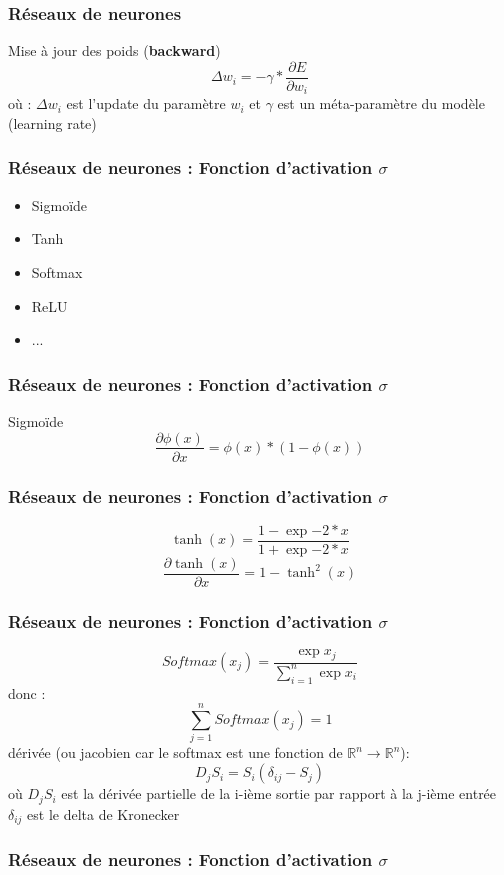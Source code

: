 \documentclass{formation}
\begin{document}
\begin{frame}
  \frametitle{Réseaux de neurones}
  Mise à jour des poids (\textbf{backward})
  \[
  \Delta w_i = -\gamma * \frac{\partial{E}}{\partial{w_i}}
  \]
  \newline
  où :
  \newline
  $\Delta w_i$ est l'update du paramètre $w_i$ et
  \newline
  $\gamma$ est un méta-paramètre du modèle (learning rate)
\end{frame}

\begin{frame}
  \frametitle{Réseaux de neurones : Fonction d'activation $\sigma$}
  \begin{itemize}
  \item Sigmoïde
  \item Tanh
  \item Softmax
  \item ReLU
  \item ...
  \end{itemize}
\end{frame}

\begin{frame}
  \frametitle{Réseaux de neurones : Fonction d'activation $\sigma$}
  Sigmoïde
  \[
  \frac{\partial{\phi(x)}}{\partial{x}}=\phi(x)*(1-\phi(x))
  \]
\end{frame}

\begin{frame}
  \frametitle{Réseaux de neurones : Fonction d'activation $\sigma$}
  \[
  \tanh(x)=\frac{1-\exp{-2*x}}{1+\exp{-2*x}}
  \]
  \[
  \frac{\partial{\tanh(x)}}{\partial{x}}=1-\tanh^2(x)
  \]
\end{frame}

\begin{frame}
  \frametitle{Réseaux de neurones : Fonction d'activation $\sigma$}
  \[
  \mathit{Softmax}(x_j)=\frac{\exp{x_j}}{\sum_{i=1}^n{\exp{x_i}}}
  \]
  donc :
  \[
  \sum_{j=1}^n{\mathit{Softmax}(x_j)}=1
  \]
  dérivée (ou jacobien car le softmax est une fonction de $\mathbb{R}^n\rightarrow\mathbb{R}^n$):
  \[
  D_jS_i = S_i(\delta_{ij}-S_j)
  \]
  où
  $D_jS_i$ est la dérivée partielle de la i-ième sortie par rapport à la j-ième entrée
  \newline
  $\delta_{ij}$ est le delta de Kronecker
\end{frame}

\begin{frame}
  \frametitle{Réseaux de neurones : Fonction d'activation $\sigma$}
\end{frame}
\end{document}
